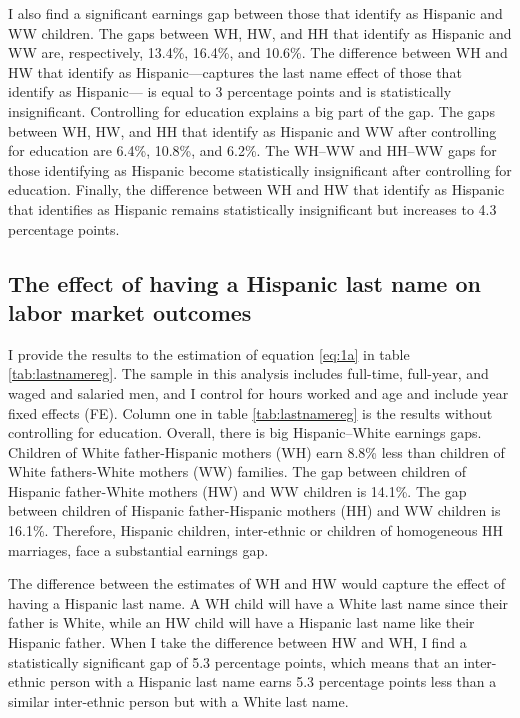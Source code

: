 \documentclass{wptemp}
\begin{document}
I also find a significant earnings gap between those that identify as Hispanic and WW children. The gaps between WH, HW, and HH that identify as Hispanic and WW are, respectively, 13.4\%, 16.4\%, and 10.6\%. The difference between WH and HW that identify as Hispanic---captures the last name effect of those that identify as Hispanic--- is equal to 3 percentage points and is statistically insignificant. Controlling for education explains a big part of the gap. The gaps between WH, HW, and HH that identify as Hispanic and WW after controlling for education are 6.4\%, 10.8\%, and 6.2\%. The WH--WW and HH--WW gaps for those identifying as Hispanic become statistically insignificant after controlling for education. Finally, the difference between WH and HW that identify as Hispanic that identifies as Hispanic remains statistically insignificant but increases to 4.3 percentage points.

\subsection{The effect of having a Hispanic last name on labor market outcomes}

I provide the results to the estimation of equation \ref{eq:1a} in table \ref{tab:lastnamereg}. The sample in this analysis includes full-time, full-year, and waged and salaried men, and I control for hours worked and age and include year fixed effects (FE). Column one in table \ref{tab:lastnamereg} is the results without controlling for education. Overall, there is big Hispanic--White earnings gaps. Children of White father-Hispanic mothers (WH) earn 8.8\% less than children of White fathers-White mothers (WW) families. The gap between children of Hispanic father-White mothers (HW) and WW children is 14.1\%. The gap between children of Hispanic father-Hispanic mothers (HH) and WW children is 16.1\%. Therefore, Hispanic children, inter-ethnic or children of homogeneous HH marriages, face a substantial earnings gap.

The difference between the estimates of WH and HW would capture the effect of having a Hispanic last name. A WH child will have a White last name since their father is White, while an HW child will have a Hispanic last name like their Hispanic father. When I take the difference between HW and WH, I find a statistically significant gap of 5.3 percentage points, which means that an inter-ethnic person with a Hispanic last name earns 5.3 percentage points less than a similar inter-ethnic person but with a White last name.
\end{document}
